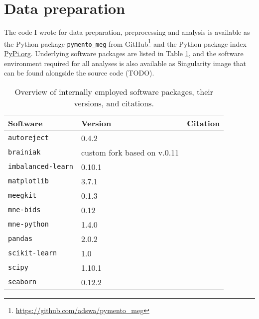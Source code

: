 \section{Data preparation}

The code I wrote for data preparation, preprocessing and analysis is available as the Python package \texttt{pymento\_meg} from GitHub\footnote{\url{https://github.com/adswa/pymento_meg}} and the Python package index \url{PyPi.org}.
Underlying software packages are listed in Table \ref{tab:software}, and the software environment required for all analyses is also available as Singularity image that can be found alongside the source code (TODO).
\begin{center}
\begin{table}[H]
	\begin{tabular}{ l l l }
		\hline
		Software	& Version 	& Citation \\ \hline
		\texttt{autoreject} 	& 0.4.2 	& \citet{jas2017autoreject} \\
		\texttt{brainiak} 	& custom fork based on v.0.11 & \citet{brainiak} \\
		\texttt{imbalanced-learn} & 0.10.1 & \citet{JMLR:v18:16-365} \\
		\texttt{matplotlib} 	& 3.7.1 	& \citet{Hunter2007} \\
		\texttt{meegkit} 	& 0.1.3 	& \citet{barascud2022} \\
		\texttt{mne-bids} 	& 0.12 		&  \citet{Appelhoff2019} \\
		\texttt{mne-python} 	& 1.4.0		& \citet{Gramfort_MEG_and_EEG_2013} \\
		\texttt{pandas} 		& 2.0.2 	& \citet{The_pandas_development_team_pandas-dev_pandas_Pandas} \\
		\texttt{scikit-learn} & 1.0	 	& \citet{scikit-learn} \\
		\texttt{scipy} 		& 1.10.1 	& \citet{2020SciPy-NMeth} \\
		\texttt{seaborn} 	& 0.12.2 	& \citet{Waskom2021}
	\end{tabular}
	\caption[Overview of software packages]{Overview of internally employed software packages, their versions, and citations.}
	\label{tab:software}
\end{table}
\end{center}

